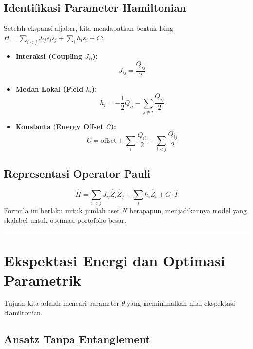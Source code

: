 \documentclass[12pt,a4paper]{article}
\providecommand{\tightlist}{%
  \setlength{\itemsep}{0pt}\setlength{\parskip}{0pt}}
\begin{document}
\hypertarget{langkah-2-identifikasi-parameter-hamiltonian}{%
\subsection{Identifikasi Parameter Hamiltonian}\label{langkah-2-identifikasi-parameter-hamiltonian}}

Setelah ekspansi aljabar, kita mendapatkan bentuk Ising \(H = \sum_{i<j} J_{ij} s_i s_j + \sum_i h_i s_i + C\):

\begin{itemize}
\tightlist
\item
  \textbf{Interaksi (Coupling \(J_{ij}\)):} \[ J_{ij} = \frac{Q_{ij}}{2} \]
\item
  \textbf{Medan Lokal (Field \(h_i\)):} \[ h_i = -\frac{1}{2} Q_{ii} - \sum_{j \neq i} \frac{Q_{ij}}{2} \]
\item
  \textbf{Konstanta (Energy Offset \(C\)):} \[ C = \text{offset} + \sum_i \frac{Q_{ii}}{2} + \sum_{i<j} \frac{Q_{ij}}{2} \]
\end{itemize}

\hypertarget{representasi-operator-pauli}{%
\subsection{Representasi Operator Pauli}\label{representasi-operator-pauli}}

\[ \hat{H} = \sum_{i<j} J_{ij} \hat{Z}_i \hat{Z}_j + \sum_i h_i \hat{Z}_i + C \cdot \hat{I} \] Formula ini berlaku untuk jumlah aset \(N\) berapapun, menjadikannya model yang skalabel untuk optimasi portofolio besar.

\begin{center}\rule{0.5\linewidth}{0.5pt}\end{center}

\hypertarget{ekspektasi-energi-dan-optimasi-parametrik}{%
\section{Ekspektasi Energi dan Optimasi Parametrik}\label{ekspektasi-energi-dan-optimasi-parametrik}}

Tujuan kita adalah mencari parameter \(\theta\) yang meminimalkan nilai ekspektasi Hamiltonian.

\hypertarget{a.-ansatz-tanpa-entanglement}{%
\subsection{Ansatz Tanpa Entanglement}\label{a.-ansatz-tanpa-entanglement}}
\end{document}
